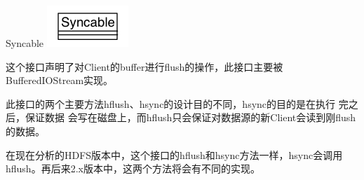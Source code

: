 \begin{XeClass}{Syncable}
\includegraphics[width=\textwidth]{cdig/Syncable.png}
     
 这个接口声明了对Client的buffer进行flush的操作，此接口主要被
 BufferedIOStream实现。
 
 此接口的两个主要方法hflush、hsync的设计目的不同，hsync的目的是在执行
 完之后，保证数据
 会写在磁盘上，而hflush只会保证对数据源的新Client会读到刚flush的数据。
 
 在现在分析的HDFS版本中，这个接口的hflush和hsync方法一样，hsync会调用
 hflush。再后来2.x版本中，这两个方法将会有不同的实现。

\end{XeClass}
